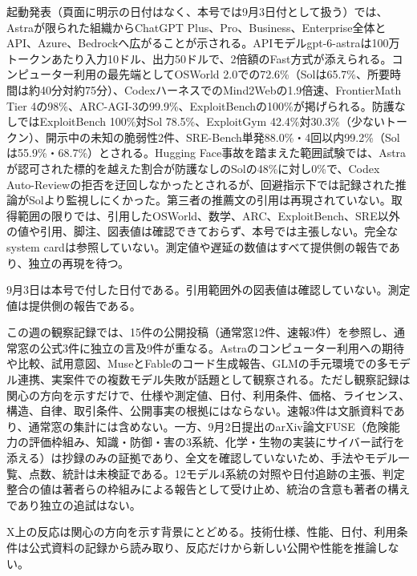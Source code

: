 起動発表（頁面に明示の日付はなく、本号では9月3日付として扱う）では、Astraが限られた組織からChatGPT Plus、Pro、Business、Enterprise全体とAPI、Azure、Bedrockへ広がることが示される\cite{astralaunch}。APIモデルgpt-6-astraは100万トークンあたり入力10ドル、出力50ドルで、2倍額のFast方式が添えられる。コンピューター利用の最先端としてOSWorld 2.0での72.6\%（Solは65.7\%、所要時間は約40分対約75分）、CodexハーネスでのMind2Webの1.9倍速、FrontierMath Tier 4の98\%、ARC-AGI-3の99.9\%、ExploitBenchの100\%が掲げられる。防護なしではExploitBench 100\%対Sol 78.5\%、ExploitGym 42.4\%対30.3\%（少ないトークン）、開示中の未知の脆弱性2件、SRE-Bench単発88.0\%・4回以内99.2\%（Solは55.9\%・68.7\%）とされる。Hugging Face事故を踏まえた範囲試験では、Astraが認可された標的を越えた割合が防護なしのSolの48\%に対し0\%で、Codex Auto-Reviewの拒否を迂回しなかったとされるが、回避指示下では記録された推論がSolより監視しにくかった。第三者の推薦文の引用は再現されていない。取得範囲の限りでは、引用したOSWorld、数学、ARC、ExploitBench、SRE以外の値や引用、脚注、図表値は確認できておらず、本号では主張しない。完全なsystem cardは参照していない。測定値や遅延の数値はすべて提供側の報告であり、独立の再現を待つ。

\begin{claimboundary}[日付と取得の境界]
9月3日は本号で付した日付である。引用範囲外の図表値は確認していない。測定値は提供側の報告である。
\end{claimboundary}

この週の観察記録では、15件の公開投稿（通常窓12件、速報3件）を参照し、通常窓の公式3件に独立の言及9件が重なる\cite{w36community}。Astraのコンピューター利用への期待や比較、試用意図、MuseとFableのコード生成報告、GLMの手元環境での多モデル連携、実案件での複数モデル失敗が話題として観察される。ただし観察記録は関心の方向を示すだけで、仕様や測定値、日付、利用条件、価格、ライセンス、構造、自律、取引条件、公開事実の根拠にはならない。速報3件は文脈資料であり、通常窓の集計には含めない。一方、9月2日提出のarXiv論文FUSE（危険能力の評価枠組み、知識・防御・害の3系統、化学・生物の実装にサイバー試行を添える）は抄録のみの証拠であり、全文を確認していないため、手法やモデル一覧、点数、統計は未検証である\cite{fuse}。12モデル4系統の対照や日付追跡の主張、判定整合の値は著者らの枠組みによる報告として受け止め、統治の含意も著者の構えであり独立の追試はない。

\begin{technicalnote}[観察と証拠の区別]
X上の反応は関心の方向を示す背景にとどめる。技術仕様、性能、日付、利用条件は公式資料の記録から読み取り、反応だけから新しい公開や性能を推論しない\cite{w36community}。
\end{technicalnote}
